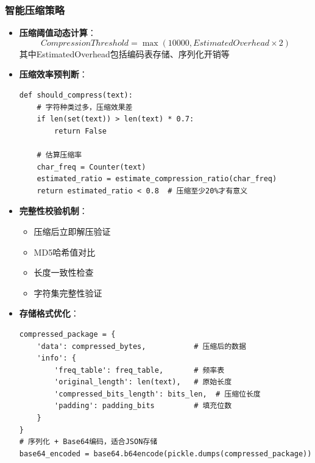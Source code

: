 \documentclass[12pt,a4paper]{article}
\begin{document}
\subsubsection{智能压缩策略}
\begin{itemize}
    \item \textbf{压缩阈值动态计算}：
    \[CompressionThreshold = \max(10000, EstimatedOverhead \times 2)\]
    其中EstimatedOverhead包括编码表存储、序列化开销等
    \item \textbf{压缩效率预判断}：
    \begin{verbatim}
def should_compress(text):
    # 字符种类过多，压缩效果差
    if len(set(text)) > len(text) * 0.7:
        return False
    
    # 估算压缩率
    char_freq = Counter(text)
    estimated_ratio = estimate_compression_ratio(char_freq)
    return estimated_ratio < 0.8  # 压缩至少20%才有意义
    \end{verbatim}
    \item \textbf{完整性校验机制}：
    \begin{itemize}
        \item 压缩后立即解压验证
        \item MD5哈希值对比
        \item 长度一致性检查
        \item 字符集完整性验证
    \end{itemize}
    \item \textbf{存储格式优化}：
    \begin{verbatim}
compressed_package = {
    'data': compressed_bytes,           # 压缩后的数据
    'info': {
        'freq_table': freq_table,       # 频率表
        'original_length': len(text),   # 原始长度
        'compressed_bits_length': bits_len,  # 压缩位长度
        'padding': padding_bits         # 填充位数
    }
}
# 序列化 + Base64编码，适合JSON存储
base64_encoded = base64.b64encode(pickle.dumps(compressed_package))
    \end{verbatim}
\end{itemize}
\end{document}
